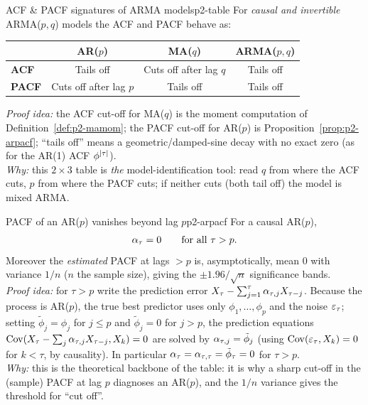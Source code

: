 \begin{theorem}{ACF \& PACF signatures of ARMA models}{p2-table}
For \emph{causal and invertible} ARMA($p,q$) models the ACF and PACF behave as:
\begin{center}
\renewcommand{\arraystretch}{1.25}
\begin{tabular}{lccc}
\toprule
 & \textbf{AR($p$)} & \textbf{MA($q$)} & \textbf{ARMA($p,q$)}\\
\midrule
\textbf{ACF}  & Tails off            & Cuts off after lag $q$ & Tails off\\
\textbf{PACF} & Cuts off after lag $p$ & Tails off             & Tails off\\
\bottomrule
\end{tabular}
\end{center}
\textit{Proof idea:} the ACF cut-off for MA($q$) is the moment computation of
Definition~\ref{def:p2-mamom}; the PACF cut-off for AR($p$) is
Proposition~\ref{prop:p2-arpacf}; ``tails off'' means a geometric/damped-sine
decay with no exact zero (as for the AR(1) ACF $\phi^{\left\lvert \tau \right\rvert}$).\\
\textit{Why:} this $2\times3$ table is \emph{the} model-identification tool:
read $q$ from where the ACF cuts, $p$ from where the PACF cuts; if neither cuts
(both tail off) the model is mixed ARMA.
\end{theorem}

\begin{proposition}{PACF of an AR($p$) vanishes beyond lag $p$}{p2-arpacf}
For a causal AR($p$),
\[
\alpha_\tau=0\qquad\text{for all }\tau>p .
\]
Moreover the \emph{estimated} PACF at lags $>p$ is, asymptotically, mean $0$
with variance $1/n$ ($n$ the sample size), giving the $\pm1.96/\sqrt n$
significance bands.\\
\textit{Proof idea:} for $\tau>p$ write the prediction error
$X_\tau-\sum_{j=1}^{\tau}\alpha_{\tau,j}X_{\tau-j}$. Because the process is
AR($p$), the true best predictor uses only $\phi_1,\dots,\phi_p$ and the noise
$\varepsilon_\tau$; setting $\tilde\phi_j=\phi_j$ for $j\le p$ and $\tilde\phi_j=0$ for
$j>p$, the prediction equations
$\operatorname{Cov}(X_\tau-\sum_j\alpha_{\tau,j}X_{\tau-j},X_k)=0$ are solved by
$\alpha_{\tau,j}=\tilde\phi_j$ (using $\operatorname{Cov}(\varepsilon_\tau,X_k)=0$ for $k<\tau$, by
causality). In particular $\alpha_\tau=\alpha_{\tau,\tau}=\tilde\phi_\tau=0$ for
$\tau>p$.\\
\textit{Why:} this is the theoretical backbone of the table: it is why a sharp
cut-off in the (sample) PACF at lag $p$ diagnoses an AR($p$), and the $1/n$
variance gives the threshold for ``cut off''.
\end{proposition}

